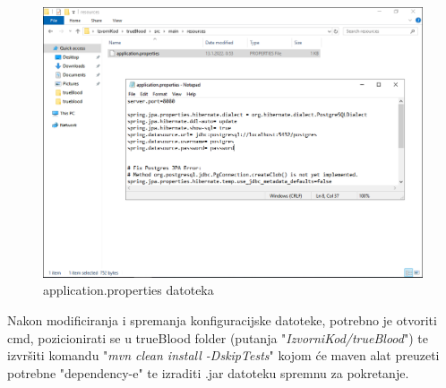 			\begin{figure}[H]
			\centering
			\includegraphics[width=\textwidth, scale=0.5]{slike/ApplicationProperties}
			\caption{application.properties datoteka}
			\label{fig:ApplicationProperties}
			\end{figure}
			
			Nakon modificiranja i spremanja konfiguracijske datoteke, potrebno je otvoriti cmd, pozicionirati se u trueBlood folder (putanja "\textit{IzvorniKod/trueBlood}") te izvršiti komandu "\textit{mvn clean install -DskipTests}" kojom će maven alat preuzeti potrebne "dependency-e" te izraditi .jar datoteku spremnu za pokretanje.
			
